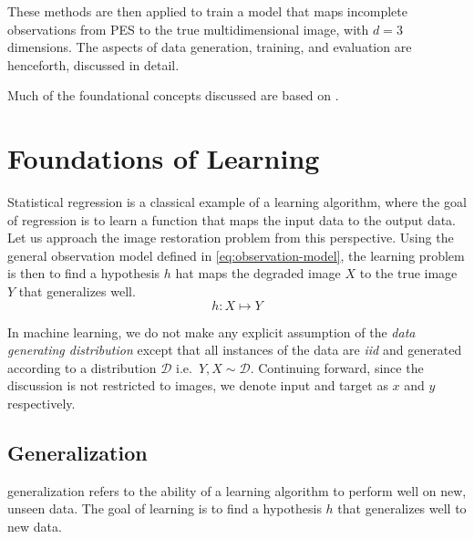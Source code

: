 These methods are then applied to train a model that maps incomplete  observations from \gls{PES} to the true multidimensional image, with $d=3$ dimensions. The aspects of data generation, training, and evaluation are henceforth, discussed in detail.

Much of the foundational concepts discussed are based on \cite{shalev-shwartzUnderstandingMachineLearning2014a,jamesIntroductionStatisticalLearning2013,tibshiraniElementsStatisticalLearning,goodfellowDeepLearning2016}.

\section{Foundations of Learning}
Statistical regression is a classical example of a learning algorithm, where the goal of regression is to learn a function that maps the input data to the output data.
Let us approach the image restoration problem from this perspective. Using the general observation model defined in \cref{eq:observation-model}, the learning problem is then to find a hypothesis $h$  hat maps the degraded image $X$ to the true image $Y$ that generalizes well.
\begin{equation}
    h: X \mapsto Y
\end{equation}

In machine learning, we  do not make any explicit assumption of the \textit{data generating distribution} except that all instances of the data are \textit{\gls{iid}} and generated according to a distribution $\mathcal{D}$ i.e.\ $Y, X \sim \mathcal{D}$. Continuing forward, since the discussion is not restricted to images, we denote input and target as $x$ and $y$ respectively. 

\subsection{Generalization}\label{sec:generalization}
\Gls{generalization} refers to the ability of a learning algorithm to perform well on new, unseen data. The goal of learning is to find a hypothesis $h$ that generalizes well to new data. 

